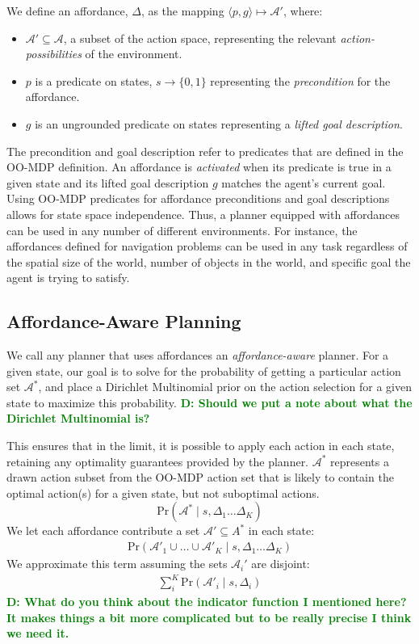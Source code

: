\documentclass[conference]{IEEEtran}
\newcommand{\dnote}[1]{\textcolor{Green}{\textbf{D: #1}}}
\begin{document}
We define an affordance, $\Delta$,
as the mapping $\langle p,g\rangle \longmapsto \mathcal{A}'$,
where:
\begin{itemize}
\item[] $\mathcal{A}' \subseteq \mathcal{A}$, a subset of the action space, representing the relevant {\it action-possibilities} of the environment.
\item[] $p$ is a predicate on states, $s \longrightarrow \{$0$, 1\}$
  representing the {\em precondition} for the affordance.
\item[] $g$ is an ungrounded predicate on states representing a {\it lifted goal description}.
\end{itemize}
The precondition and goal description refer to predicates that are defined in the OO-MDP definition.
An affordance is {\it activated} when its predicate is true in a given state and its lifted goal description $g$ matches the agent's current goal. 
Using OO-MDP predicates for affordance preconditions and goal descriptions 
allows for state space independence. Thus, a planner equipped with
affordances can be used in any number of different environments. For instance, the affordances defined for 
navigation problems can be used in any task regardless of the spatial size of the world, 
number of objects in the world, and specific goal the agent is trying to satisfy.

\subsection{Affordance-Aware Planning}
We call any planner that
uses affordances an {\it affordance-aware} planner. For a given state, 
our goal is to solve for the probability of getting a particular action set $\mathcal{A}^*$, and place a Dirichlet Multinomial
prior on the action selection for a given state to maximize this probability. \dnote{Should we put a note about what the Dirichlet Multinomial is?}

This ensures that in the limit, it is possible to apply each action in each state, retaining
any optimality guarantees provided by the planner. $\mathcal{A}^*$ represents
a drawn action subset from the OO-MDP action set that is likely to contain the optimal action(s) for a given state,
but not suboptimal actions.
\begin{equation}
\text{Pr}(\mathcal{A}^* \mid s, \Delta_1 \dots \Delta_K)
\end{equation}
We let each affordance contribute a set $\mathcal{A}' \subseteq A^*$ in each state:
\begin{align}
\text{Pr}(\mathcal{A}'_1 \cup \ldots \cup \mathcal{A}'_K \mid s, \Delta_1 \dots \Delta_K)
\end{align}
We approximate this term assuming the sets $\mathcal{A}_i'$ are disjoint:
\begin{align}
\sum_i^K \text{Pr}(\mathcal{A}'_i \mid s, \Delta_i)
\end{align}
\dnote{What do you think about the indicator function I mentioned here? It makes things a bit more complicated but to be really precise
I think we need it.}
\end{document}
